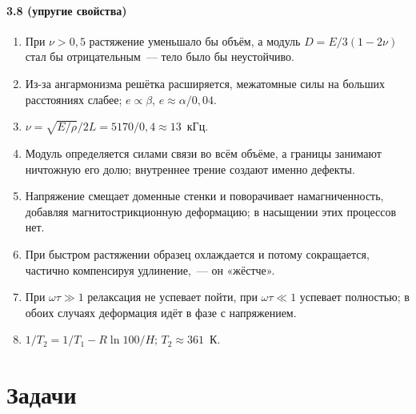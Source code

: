 {\paragraph{3.8 (упругие свойства)}
\begin{enumerate}[label=\arabic*.]
\item При $\nu>0{,}5$ растяжение уменьшало бы объём, а модуль
$D=E/3(1-2\nu)$ стал бы отрицательным~— тело было бы неустойчиво.
\item Из-за ангармонизма решётка расширяется, межатомные силы на больших
расстояниях слабее; $e\propto\beta$, $e\approx\alpha/0{,}04$.
\item $\nu=\sqrt{E/\rho}/2L=5170/0{,}4\approx13$~кГц.
\item Модуль определяется силами связи во всём объёме, а границы
занимают ничтожную его долю; внутреннее трение создают именно дефекты.
\item Напряжение смещает доменные стенки и поворачивает намагниченность,
добавляя магнитострикционную деформацию; в насыщении этих процессов нет.
\item При быстром растяжении образец охлаждается и потому сокращается,
частично компенсируя удлинение,~— он «жёстче».
\item При $\omega\tau\gg1$ релаксация не успевает пойти, при $\omega\tau\ll1$
успевает полностью; в обоих случаях деформация идёт в фазе с напряжением.
\item $1/T_2=1/T_1-R\ln100/H$; $T_2\approx361$~К.
\end{enumerate}
}

\section*{Задачи}

